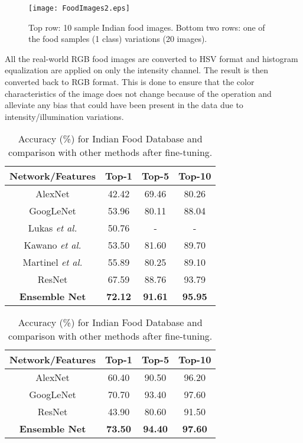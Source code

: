 \documentclass[journal]{IEEEtran}%
\begin{document}
\begin{figure}
\centering
\texttt{[image: FoodImages2.eps]}
\caption{Top row: 10 sample Indian food images. Bottom two rows: one of the food samples (1 class) variations (20 images).} \label{Fig2:FoodImages}
\end{figure}

All the real-world RGB food images are converted to HSV format and histogram equalization are applied on only the intensity channel. The result is then converted back to RGB format. This is done to ensure that the color characteristics of the image does not change because of the operation and alleviate any bias that could have been present in the data due to intensity/illumination variations.
\begin{table}[!htb] \tiny
    \begin{minipage}{.5\linewidth}
      \centering
        \caption{\tiny Accuracy (\%) for ETH Food-101 and comparison with other methods after fine-tuning.} \label{Table2}
        \begin{tabular}{|c|c|c|c|}
        \hline
        Network/Features & Top-1 & Top-5 & Top-10 \\
        \hline
        AlexNet & 42.42 & 69.46 & 80.26 \\
        \hline
        GoogLeNet & 53.96 & 80.11 & 88.04 \\
        \hline
        Lukas \emph{et al.} \cite{Bossard1} & 50.76 & - & - \\
        \hline
        Kawano \emph{et al.} \cite{Kawano1} & 53.50 & 81.60 & 89.70 \\
        \hline
        Martinel \emph{et al.} \cite{Martinel1} & 55.89 & 80.25 & 89.10 \\
        \hline
        ResNet & 67.59 & 88.76 & 93.79 \\
        \hline
        \textbf{Ensemble Net} & \textbf{72.12} & \textbf{91.61} & \textbf{95.95} \\
        \hline
        \end{tabular}
    \end{minipage}
    \begin{minipage}{.48\linewidth}
      \caption{\tiny Accuracy (\%) for Indian Food Database and comparison with other methods after fine-tuning.} \label{Table3}
      \begin{tabular}{|c|c|c|c|}
      \hline
      Network/Features & Top-1 & Top-5 & Top-10 \\
      \hline
      AlexNet & 60.40 & 90.50 & 96.20 \\
      \hline
      GoogLeNet & 70.70 & 93.40 & 97.60 \\
      \hline
      ResNet & 43.90 & 80.60 & 91.50 \\
      \hline
      \textbf{Ensemble Net} & \textbf{73.50}  & \textbf{94.40} & \textbf{97.60} \\
      \hline
      \end{tabular}
    \end{minipage}%
\end{table}
\end{document}
